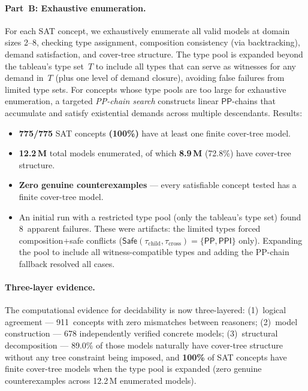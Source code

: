 \documentclass[a4paper,11pt]{article}
\theoremstyle{definition}
\newcommand{\PP}{\ensuremath{\mathsf{PP}}}
\newcommand{\PPI}{\ensuremath{\mathsf{PPI}}}
\newcommand{\Safe}{\ensuremath{\mathsf{Safe}}}
\begin{document}
\paragraph{Part~B: Exhaustive enumeration.}
For each SAT concept, we exhaustively enumerate all valid models
at domain sizes 2--8, checking type assignment, composition
consistency (via backtracking), demand satisfaction, and cover-tree
structure.  The type pool is expanded beyond the tableau's type set~$T$
to include all types that can serve as witnesses for any demand in~$T$
(plus one level of demand closure), avoiding false failures from
limited type sets.  For concepts whose type pools are too large for
exhaustive enumeration, a targeted \emph{PP-chain search} constructs
linear $\PP$-chains that accumulate and satisfy existential demands
across multiple descendants.  Results:
\begin{itemize}[nosep]
  \item \textbf{775/775} SAT concepts \textbf{(100\%)} have at least one
    finite cover-tree model.
  \item \textbf{12.2\,M} total models enumerated, of which
    \textbf{8.9\,M} (72.8\%) have cover-tree structure.
  \item \textbf{Zero genuine counterexamples} --- every satisfiable concept
    tested has a finite cover-tree model.
  \item An initial run with a restricted type pool (only the
    tableau's type set) found 8~apparent failures.  These were
    artifacts: the limited types forced composition$+$safe conflicts
    ($\Safe(\tau_{\text{child}}, \tau_{\text{cross}}) = \{\PP,\PPI\}$
    only).  Expanding the pool to include all witness-compatible types
    and adding the PP-chain fallback resolved all cases.
\end{itemize}

\paragraph{Three-layer evidence.}
The computational evidence for decidability is now three-layered:
(1)~logical agreement --- 911~concepts with zero mismatches between
reasoners; (2)~model construction --- 678 independently verified
concrete models; (3)~structural decomposition --- 89.0\% of those
models naturally have cover-tree structure without any tree
constraint being imposed, and \textbf{100\%} of SAT concepts have finite
cover-tree models when the type pool is expanded (zero genuine
counterexamples across 12.2\,M enumerated models).
\end{document}
